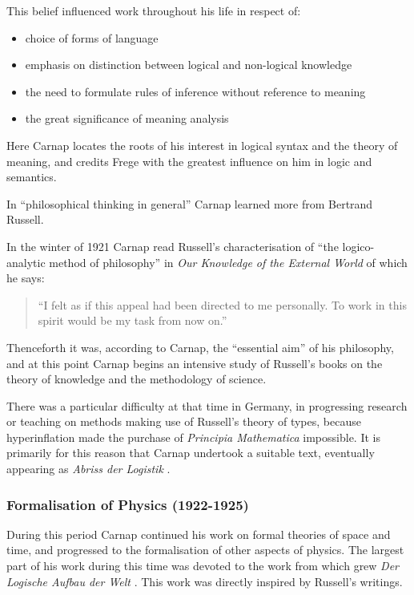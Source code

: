\documentclass[10pt,titlepage]{book}
\begin{document}
This belief influenced work throughout his life in respect of:
\begin{itemize}
\item choice of forms of language
\item emphasis on distinction between logical and non-logical knowledge
\item the need to formulate rules of inference without reference to meaning
\item the great significance of meaning analysis
\end{itemize}

Here Carnap locates the roots of his interest in logical syntax and the theory of meaning, and credits Frege with the greatest influence on him in logic and semantics.

In ``philosophical thinking in general'' Carnap learned more from Bertrand Russell.

In the winter of 1921 Carnap read Russell's characterisation of ``the logico-analytic method of philosophy'' in \emph{Our Knowledge of the External World} \cite{russell1921} of which he says:
\begin{quote}
``I felt as if this appeal had been directed to me personally.
To work in this spirit would be my task from now on.''
\end{quote}
Thenceforth it was, according to Carnap, the ``essential aim'' of his philosophy, and at this point Carnap begins an intensive study of Russell's books on the theory of knowledge and the methodology of science.

There was a particular difficulty at that time in Germany, in progressing research or teaching on methods making use of Russell's theory of types, because hyperinflation made the purchase of \emph{Principia Mathematica} impossible.
It is primarily for this reason that Carnap undertook a suitable text, eventually appearing as \emph{Abriss der Logistik} \cite{carnap29}.

\subsubsection{Formalisation of Physics (1922-1925)}

During this period Carnap continued his work on formal theories of space and time, and progressed to the formalisation of other aspects of physics.
The largest part of his work during this time was devoted to the work from which grew \emph{Der Logische Aufbau der Welt} \cite{carnap28}.
This work was directly inspired by Russell's writings.
\end{document}

